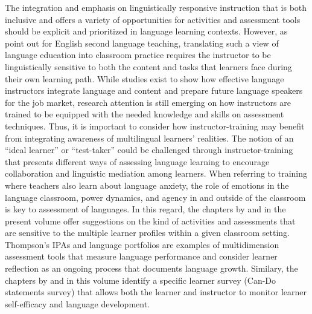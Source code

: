 \documentclass[output=paper]{langscibook}
\begin{document}
The integration and emphasis on linguistically responsive instruction that is both inclusive and offers a variety of opportunities for activities and assessment tools should be explicit and prioritized in language learning contexts. However, as \citet{HuangLaskowski2014} point out for English second language teaching, translating such a view of language education into classroom practice requires the instructor to be linguistically sensitive to both the content and tasks that learners face during their own learning path. While studies exist to show how effective language instructors integrate language and content and prepare future language speakers for the job market, research attention is still emerging on how instructors are trained to be equipped with the needed knowledge and skills on assessment techniques. Thus, it is important to consider how instructor-training may benefit from integrating awareness of multilingual learners' realities. The notion of an “ideal learner” or “test-taker” could be challenged through instructor-training that presents different ways of assessing language learning to encourage collaboration and linguistic mediation among learners. When referring to training where teachers also learn about language anxiety, the role of emotions in the language classroom, power dynamics, and agency in and outside of the classroom is key to assessment of languages. In this regard, the chapters by  and  in the present volume offer suggestions on the kind of activities and assessments that are sensitive to the multiple learner profiles within a given classroom setting. Thompson’s IPAs and language portfolios are examples of multidimension assessment tools that measure language performance and consider learner reflection as an ongoing process that documents language growth. Similary, the chapters by   and  in this volume identify a specific learner survey (Can-Do statements survey) that allows both the learner and instructor to monitor learner self-efficacy and language development.
\end{document}
